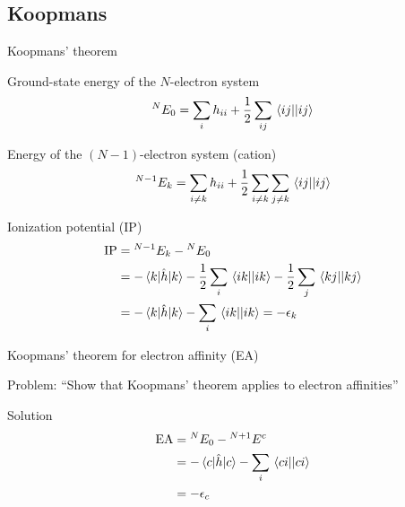 \documentclass[aspectratio=169,9pt]{beamer}
\newcommand{\hh}{\hat{h}}
\newcommand{\violet}[1]{\textcolor{hfViolet}{#1}}
\begin{document}
\subsection{Koopmans}
\begin{frame}{Koopmans' theorem}
	\small
	\begin{block}{Ground-state energy of the $N$-electron system}
		\begin{equation}
			{}^{N} E_0  = \sum_{i} h_{ii} + \frac{1}{2} \sum_{ij} \mel{ij}{}{ij}
		\end{equation}
	\end{block}
	\begin{block}{Energy of the $(N-1)$-electron system (cation)}
		\begin{equation}
			{}^{N-1}E_k  = \sum_{i \neq k} h_{ii} + \frac{1}{2} \sum_{i \neq k} \sum_{j \neq k} \mel{ij}{}{ij}
		\end{equation}
	\end{block}
	\begin{block}{Ionization potential (IP)}
		\begin{equation}
		\begin{split}
			\text{IP} 
			& = {}^{N-1}E_k - {}^{N} E_0
			\\
			& = - \mel{k}{\hh}{k} - \frac{1}{2} \sum_{i} \mel{ik}{}{ik} - \frac{1}{2} \sum_{j} \mel{kj}{}{kj}
			\\
			& = - \mel{k}{\hh}{k} - \sum_{i} \mel{ik}{}{ik} 
			= - \epsilon_k 
		\end{split}
		\end{equation}
	\end{block}
\end{frame}

\begin{frame}{Koopmans' theorem for electron affinity (EA)}
	\begin{block}{Problem:}
		\violet{``Show that Koopmans' theorem applies to electron affinities''}
	\end{block}
	\pause
	\begin{block}{Solution}
		\begin{equation}
		\begin{split}
			\text{EA} 
			& = {}^{N}E_0 - {}^{N+1} E^c
			\\
			& = - \mel{c}{\hh}{c} - \sum_{i} \mel{ci}{}{ci} 
			\\
			& = - \epsilon_c 
		\end{split}
		\end{equation}

	\end{block}
\end{frame}
\end{document}
